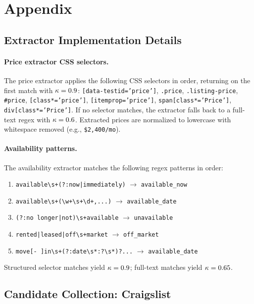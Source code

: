 \section{Appendix}

\subsection{Extractor Implementation Details}
\label{app:extractors}

\paragraph{Price extractor CSS selectors.}
The price extractor applies the following CSS selectors in order, returning on the
first match with $\kappa = 0.9$:
\texttt{[data-testid='price']},
\texttt{.price},
\texttt{.listing-price},
\texttt{\#price},
\texttt{[class*='price']},
\texttt{[itemprop='price']},
\texttt{span[class*='Price']},
\texttt{div[class*='Price']}.
If no selector matches, the extractor falls back to a full-text regex with $\kappa = 0.6$.
Extracted prices are normalized to lowercase with whitespace removed
(e.g., \texttt{\$2,400/mo}).

\paragraph{Availability patterns.}
The availability extractor matches the following regex patterns in order:
\begin{enumerate}
  \item \texttt{available\textbackslash s+(?:now|immediately)} $\to$ \texttt{available\_now}
  \item \texttt{available\textbackslash s+(\textbackslash w+\textbackslash s+\textbackslash d+,...)} $\to$ \texttt{available\_date}
  \item \texttt{(?:no longer|not)\textbackslash s+available} $\to$ \texttt{unavailable}
  \item \texttt{rented|leased|off\textbackslash s+market} $\to$ \texttt{off\_market}
  \item \texttt{move[- ]in\textbackslash s+(?:date\textbackslash s*:?\textbackslash s*)?...} $\to$ \texttt{available\_date}
\end{enumerate}
Structured selector matches yield $\kappa = 0.9$; full-text matches yield $\kappa = 0.65$.

\subsection{Candidate Collection: Craigslist}
\label{app:craigslist}

